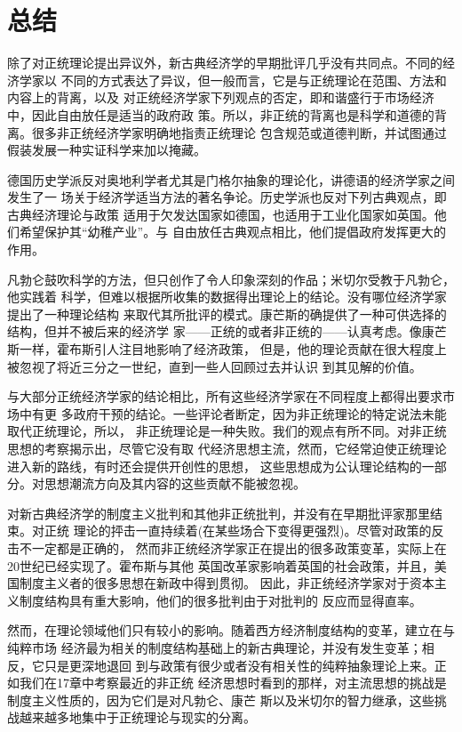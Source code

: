 \section{总结}

除了对正统理论提出异议外，新古典经济学的早期批评几乎没有共同点。不同的经济学家以
不同的方式表达了异议，但一般而言，它是与正统理论在范围、方法和内容上的背离，以及
对正统经济学家下列观点的否定，即和谐盛行于市场经济中，因此自由放任是适当的政府政
策。所以，非正统的背离也是科学和道德的背离。很多非正统经济学家明确地指责正统理论
包含规范或道德判断，并试图通过假装发展一种实证科学来加以掩藏。

德国历史学派反对奥地利学者尤其是门格尔抽象的理论化，讲德语的经济学家之间发生了一
场关于经济学适当方法的著名争论。历史学派也反对下列古典观点，即古典经济理论与政策
适用于欠发达国家如德国，也适用于工业化国家如英国。他们希望保护其“幼稚产业”。与
自由放任古典观点相比，他们提倡政府发挥更大的作用。

凡勃仑鼓吹科学的方法，但只创作了令人印象深刻的作品；米切尔受教于凡勃仑，他实践着
科学，但难以根据所收集的数据得出理论上的结论。没有哪位经济学家提出了一种理论结构
来取代其所批评的模式。康芒斯的确提供了一种可供选择的结构，但并不被后来的经济学
家——正统的或者非正统的——认真考虑。像康芒斯一样，霍布斯引人注目地影响了经济政策，
但是，他的理论贡献在很大程度上被忽视了将近三分之一世纪，直到一些人回顾过去并认识
到其见解的价值。

与大部分正统经济学家的结论相比，所有这些经济学家在不同程度上都得出要求市场中有更
多政府干预的结论。一些评论者断定，因为非正统理论的特定说法未能取代正统理论，所以，
非正统理论是一种失败。我们的观点有所不同。对非正统思想的考察揭示出，尽管它没有取
代经济思想主流，然而，它经常迫使正统理论进入新的路线，有时还会提供开创性的思想，
这些思想成为公认理论结构的一部分。对思想潮流方向及其内容的这些贡献不能被忽视。

对新古典经济学的制度主义批判和其他非正统批判，并没有在早期批评家那里结束。对正统
理论的抨击一直持续着(在某些场合下变得更强烈)。尽管对政策的反击不一定都是正确的，
然而非正统经济学家正在提出的很多政策变革，实际上在20世纪已经实现了。霍布斯与其他
英国改革家影响着英国的社会政策，并且，美国制度主义者的很多思想在新政中得到贯彻。
因此，非正统经济学家对于资本主义制度结构具有重大影响，他们的很多批判由于对批判的
反应而显得直率。

然而，在理论领域他们只有较小的影响。随着西方经济制度结构的变革，建立在与纯粹市场
经济最为相关的制度结构基础上的新古典理论，并没有发生变革；相反，它只是更深地退回
到与政策有很少或者没有相关性的纯粹抽象理论上来。正如我们在17章中考察最近的非正统
经济思想时看到的那样，对主流思想的挑战是制度主义性质的，因为它们是对凡勃仑、康芒
斯以及米切尔的智力继承，这些挑战越来越多地集中于正统理论与现实的分离。

